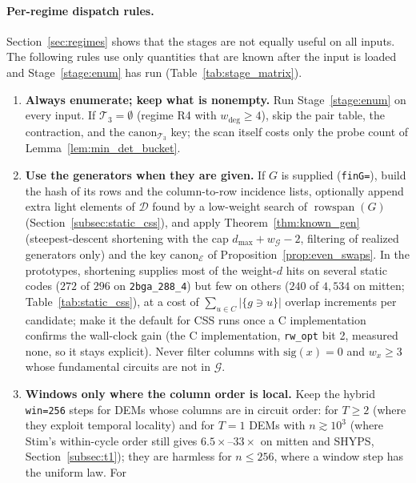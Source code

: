 \documentclass[12pt]{article}
\theoremstyle{definition}
\newcommand{\Dc}{\mathcal{D}}
\newcommand{\Tc}{\mathcal{T}_3}
\newcommand{\Gc}{\mathcal{G}}
\newcommand{\ttt}[1]{\texttt{#1}}
\begin{document}
\paragraph{Per-regime dispatch rules.}
Section~\ref{sec:regimes} shows that the stages are not equally useful on all inputs. The following rules use only
quantities that are known after the input is loaded and Stage~\ref{stage:enum} has run (Table~\ref{tab:stage_matrix}).
\begin{enumerate}[label=\textbf{D\arabic*.}, ref=D\arabic*, wide=0pt]
  \item\label{disp:enum} \textbf{Always enumerate; keep what is nonempty.} Run Stage~\ref{stage:enum} on every input.
    If $\Tc = \emptyset$ (regime R4 with $w_{\deg} \ge 4$), skip the pair table, the contraction, and the
    $\mathrm{canon}_{\Tc}$ key; the scan itself costs only the probe count of Lemma~\ref{lem:min_det_bucket}.
  \item\label{disp:gen} \textbf{Use the generators when they are given.} If $G$ is supplied (\ttt{finG=}), build the
    hash of its rows and the column-to-row incidence lists, optionally append extra light elements of $\Dc$ found by a
    low-weight search of $\operatorname{rowspan}(G)$ (Section~\ref{subsec:static_css}), and apply
    Theorem~\ref{thm:known_gen} (steepest-descent shortening with the cap $d_{\max} + w_{\Gc} - 2$, filtering of
    realized generators only) and the key $\mathrm{canon}_{\mathcal{E}}$ of Proposition~\ref{prop:even_swaps}. In the
    prototypes, shortening supplies most of the weight-$d$ hits on several static codes ($272$ of $296$ on
    \ttt{2bga\_288\_4}) but few on others ($240$ of $4{,}534$ on mitten; Table~\ref{tab:static_css}), at a cost of
    $\sum_{u \in C} |\{g \ni u\}|$ overlap increments per candidate; make it the default for CSS runs once a C
    implementation confirms the wall-clock gain (the C implementation, \ttt{rw\_opt} bit 2, measured none, so it stays
    explicit). Never filter columns with $\mathrm{sig}(x) = 0$ and $w_x \ge 3$ whose
    fundamental circuits are not in $\Gc$.
  \item\label{disp:windows} \textbf{Windows only where the column order is local.} Keep the hybrid \ttt{win=256} steps
    for DEMs whose columns are in circuit order: for $T \ge 2$ (where they exploit temporal locality) and for $T = 1$
    DEMs with $n \gtrsim 10^3$ (where Stim's within-cycle order still gives $6.5\times$--$33\times$ on mitten and
    SHYPS, Section~\ref{subsec:t1}); they are harmless for $n \le 256$, where a window step has the uniform law. For

\end{enumerate}
\end{document}
